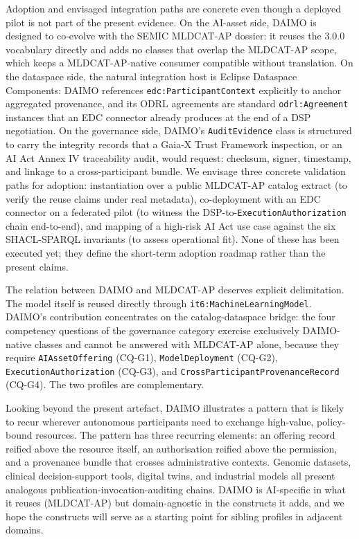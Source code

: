 \documentclass[Afour,sagev,times]{sagej}
\newcommand{\code}[1]{\texttt{#1}}
\begin{document}
Adoption and envisaged integration paths are concrete even though a deployed pilot is not part of the present evidence. On the AI-asset side, DAIMO is designed to co-evolve with the SEMIC MLDCAT-AP dossier: it reuses the 3.0.0 vocabulary directly and adds no classes that overlap the MLDCAT-AP scope, which keeps a MLDCAT-AP-native consumer compatible without translation. On the dataspace side, the natural integration host is Eclipse Dataspace Components: DAIMO references \code{edc:ParticipantContext} explicitly to anchor aggregated provenance, and its ODRL agreements are standard \code{odrl:Agreement} instances that an EDC connector already produces at the end of a DSP negotiation. On the governance side, DAIMO's \code{AuditEvidence} class is structured to carry the integrity records that a Gaia-X Trust Framework inspection, or an AI Act Annex IV traceability audit, would request: checksum, signer, timestamp, and linkage to a cross-participant bundle. We envisage three concrete validation paths for adoption: instantiation over a public MLDCAT-AP catalog extract (to verify the reuse claims under real metadata), co-deployment with an EDC connector on a federated pilot (to witness the DSP-to-\code{ExecutionAuthorization} chain end-to-end), and mapping of a high-risk AI Act use case against the six SHACL-SPARQL invariants (to assess operational fit). None of these has been executed yet; they define the short-term adoption roadmap rather than the present claims.

The relation between DAIMO and MLDCAT-AP deserves explicit delimitation. The model itself is reused directly through \code{it6:MachineLearningModel}. DAIMO's contribution concentrates on the catalog-dataspace bridge: the four competency questions of the governance category exercise exclusively DAIMO-native classes and cannot be answered with MLDCAT-AP alone, because they require \code{AIAssetOffering} (CQ-G1), \code{ModelDeployment} (CQ-G2), \code{ExecutionAuthorization} (CQ-G3), and \code{CrossParticipantProvenanceRecord} (CQ-G4). The two profiles are complementary.

Looking beyond the present artefact, DAIMO illustrates a pattern that is likely to recur wherever autonomous participants need to exchange high-value, policy-bound resources. The pattern has three recurring elements: an offering record reified above the resource itself, an authorisation reified above the permission, and a provenance bundle that crosses administrative contexts. Genomic datasets, clinical decision-support tools, digital twins, and industrial models all present analogous publication-invocation-auditing chains. DAIMO is AI-specific in what it reuses (MLDCAT-AP) but domain-agnostic in the constructs it adds, and we hope the constructs will serve as a starting point for sibling profiles in adjacent domains.
\end{document}
